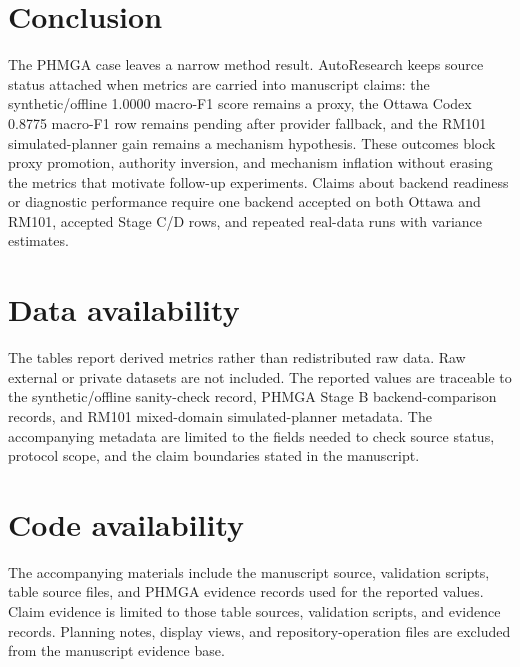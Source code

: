 \documentclass[11pt]{article}
\begin{document}
\section{Conclusion}
The PHMGA case leaves a narrow method result. AutoResearch keeps source status attached when metrics are carried into manuscript claims: the synthetic/offline 1.0000 macro-F1 score remains a proxy, the Ottawa Codex 0.8775 macro-F1 row remains pending after provider fallback, and the RM101 simulated-planner gain remains a mechanism hypothesis. These outcomes block proxy promotion, authority inversion, and mechanism inflation without erasing the metrics that motivate follow-up experiments. Claims about backend readiness or diagnostic performance require one backend accepted on both Ottawa and RM101, accepted Stage C/D rows, and repeated real-data runs with variance estimates.

\section*{Data availability}
The tables report derived metrics rather than redistributed raw data. Raw external or private datasets are not included. The reported values are traceable to the synthetic/offline sanity-check record, PHMGA Stage B backend-comparison records, and RM101 mixed-domain simulated-planner metadata. The accompanying metadata are limited to the fields needed to check source status, protocol scope, and the claim boundaries stated in the manuscript.

\section*{Code availability}
The accompanying materials include the manuscript source, validation scripts, table source files, and PHMGA evidence records used for the reported values. Claim evidence is limited to those table sources, validation scripts, and evidence records. Planning notes, display views, and repository-operation files are excluded from the manuscript evidence base.
\end{document}
